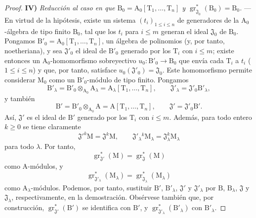\begin{proof}
\medskip
\noindent\textbf{IV)} \emph{Reducción al caso en que $\mathrm{B}_0=\mathrm{A}_0[\mathrm{T}_1,\ldots,\mathrm{T}_n]$ y $\operatorname{gr}^*_{\mathfrak{J}_0}(\mathrm{B}_0)=\mathrm{B}_0$.} --- En virtud de la hipótesis, existe un sistema $(t_i)_{1\leqslant i\leqslant n}$ de generadores de la $\mathrm{A}_0$-álgebra de tipo finito $\mathrm{B}_0$, tal que los $t_i$ para $i\leqslant m$ generan el ideal $\mathfrak{J}_0$ de $\mathrm{B}_0$. Pongamos $\mathrm{B}'_0=\mathrm{A}_0[\mathrm{T}_1,\ldots,\mathrm{T}_n]$, un álgebra de polinomios (y, por tanto, noetheriana), y sea $\mathfrak{J}'_0$ el ideal de $\mathrm{B}'_0$ generado por los $\mathrm{T}_i$ con $i\leqslant m$; existe entonces un $\mathrm{A}_0$-homomorfismo sobreyectivo $u_0:\mathrm{B}'_0\to\mathrm{B}_0$ que envía cada $\mathrm{T}_i$ a $t_i$ ($1\leqslant i\leqslant n$) y que, por tanto, satisface $u_0(\mathfrak{J}'_0)=\mathfrak{J}_0$. Este homomorfismo permite considerar $\mathrm{M}_0$ como un $\mathrm{B}'_0$-módulo de tipo finito. Pongamos
\[
  \mathrm{B}'_\lambda=\mathrm{B}'_0\otimes_{\mathrm{A}_0}\mathrm{A}_\lambda
  =\mathrm{A}_\lambda[\mathrm{T}_1,\ldots,\mathrm{T}_n],
  \qquad
  \mathfrak{J}'_\lambda=\mathfrak{J}'_0\mathrm{B}'_\lambda,
\]
y también
\[
  \mathrm{B}'=\mathrm{B}'_0\otimes_{\mathrm{A}_0}\mathrm{A}
  =\mathrm{A}[\mathrm{T}_1,\ldots,\mathrm{T}_n],
  \qquad
  \mathfrak{J}'=\mathfrak{J}'_0\mathrm{B}'.
\]
Así, $\mathfrak{J}'$ es el ideal de $\mathrm{B}'$ generado por los $\mathrm{T}_i$ con $i\leqslant m$. Además, para todo entero $k\geqslant 0$ se tiene claramente
\[
  \mathfrak{J}'^k\mathrm{M}=\mathfrak{J}^k\mathrm{M},
  \qquad
  \mathfrak{J}'_\lambda{}^k\mathrm{M}_\lambda
  =\mathfrak{J}_\lambda^k\mathrm{M}_\lambda
\]
para todo $\lambda$. Por tanto,
\[
  \operatorname{gr}^*_{\mathfrak{J}'}(\mathrm{M})
  =\operatorname{gr}^*_{\mathfrak{J}}(\mathrm{M})
\]
como $\mathrm{A}$-módulos, y
\[
  \operatorname{gr}^*_{\mathfrak{J}'_\lambda}(\mathrm{M}_\lambda)
  =\operatorname{gr}^*_{\mathfrak{J}_\lambda}(\mathrm{M}_\lambda)
\]
como $\mathrm{A}_\lambda$-módulos. Podemos, por tanto, sustituir $\mathrm{B}'$, $\mathrm{B}'_\lambda$, $\mathfrak{J}'$ y $\mathfrak{J}'_\lambda$ por $\mathrm{B}$, $\mathrm{B}_\lambda$, $\mathfrak{J}$ y $\mathfrak{J}_\lambda$, respectivamente, en la demostración. Obsérvese también que, por construcción, $\operatorname{gr}^*_{\mathfrak{J}'}(\mathrm{B}')$ se identifica con $\mathrm{B}'$, y $\operatorname{gr}^*_{\mathfrak{J}'_\lambda}(\mathrm{B}'_\lambda)$ con $\mathrm{B}'_\lambda$.


\end{proof}
